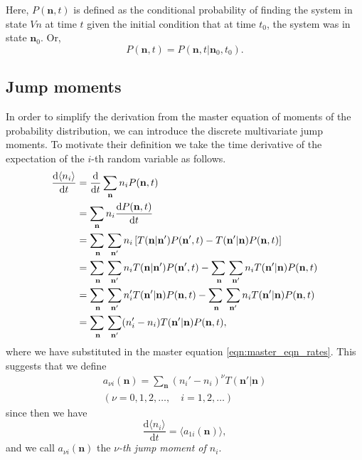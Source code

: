 \documentclass[a4paper,11pt]{article}
\numberwithin{equation}{section}
\newcommand{\diff}[2]{\frac{\mathrm{d} #1}{\mathrm{d} #2}}
\newcommand{\V}[1]{\mathbf{#1}}
\newcommand{\E}[1]{\langle #1 \rangle}
\begin{document}
Here, \(P(\V{n},t)\) is defined as the conditional probability of finding the
system in state \(V{n}\) at time \(t\) given the initial condition that at time
\(t_0\), the system was in state \(\V{n}_0\). Or,
\begin{equation*}
    P(\V{n},t) = P(\V{n},t | \V{n}_0, t_0).
\end{equation*}

\subsection{Jump moments}
In order to simplify the derivation from the master equation of moments of the
probability distribution, we can introduce the discrete multivariate jump
moments. To motivate their definition we take the time derivative of the
expectation of the \(i\)-th random variable as follows.
\begin{align*}
    \diff{\E{n_i}}{t} &= \diff{}{t}\sum_{\V{n}}n_i P(\V{n},t)\\
    &= \sum_{\V{n}}n_i \diff{P(\V{n},t)}{t}\\
    &= \adjustlimits\sum_{\V{n}}\sum_{\V{n}'} n_i \left[ T(\V{n}|\V{n}') P(\V{n}',t) -
    T(\V{n}'|\V{n}) P(\V{n},t)\right]\\
    &= \adjustlimits\sum_{\V{n}}\sum_{\V{n}'} n_i T(\V{n}|\V{n}') P(\V{n}',t) -
    \adjustlimits\sum_{\V{n}}\sum_{\V{n}'} n_i T(\V{n}'|\V{n}) P(\V{n},t)\\
    &= \adjustlimits\sum_{\V{n}}\sum_{\V{n}'} n_i' T(\V{n}'|\V{n}) P(\V{n},t) -
    \adjustlimits\sum_{\V{n}}\sum_{\V{n}'} n_i T(\V{n}'|\V{n}) P(\V{n},t)\\
    &= \adjustlimits\sum_{\V{n}}\sum_{\V{n}'} (n_i' - n_i) T(\V{n}'|\V{n})
    P(\V{n},t),
\end{align*}
where we have substituted in the master equation \eqref{eqn:master_eqn_rates}.
This suggests that we define
\begin{equation}
    \begin{gathered}
        a_{\nu i}(\V{n}) = \sum_{\V{n}} (n_i'-n_i)^\nu T(\V{n}'|\V{n})\\
        (\nu = 0,1,2,\dotsc,\quad i=1,2,\dotsc)
    \end{gathered}
    \label{eqn:jump_moment}
\end{equation}
since then we have
\begin{equation}
    \diff{\E{n_i}}{t} = \E{a_{1i}(\V{n})},
    \label{eqn:time_evo_expectation_jump_moment}
\end{equation}
and we call \(a_{\nu i}(\V{n})\) the \emph{\(\nu\)-th jump moment of \(n_i\)}.
\end{document}
